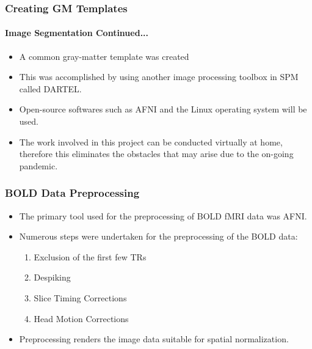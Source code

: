 \documentclass{beamer}
\begin{document}
  \begin{frame}[t]
    \frametitle{Creating GM Templates}
    \framesubtitle{Image Segmentation Continued...}

    \begin{itemize}

      \vskip 25pt

      \item  A common gray-matter template was created  \vskip 10pt

      \item This was accomplished by using another image processing
        toolbox in SPM called DARTEL. \vskip 10pt

      \item Open-source softwares such as AFNI and the Linux operating
        system will be used. \vskip 10pt

      \item The work involved in this project can be conducted
        virtually at home, therefore this eliminates the obstacles
        that may arise due to the on-going pandemic.

    \end{itemize}

  \end{frame}


  \begin{frame}[t]
    \frametitle{BOLD Data Preprocessing}

    \begin{itemize}

      \vskip 25pt

      \item  The primary tool used for the preprocessing of BOLD fMRI
        data was AFNI. \vskip 10pt

      \item Numerous steps were undertaken for the preprocessing of
        the BOLD data:

        \begin{enumerate}
          \item Exclusion of the first few TRs
          \item Despiking
          \item Slice Timing Corrections
          \item Head Motion Corrections
        \end{enumerate} \vskip 10pt

    \item Preprocessing renders the image data suitable for
      spatial normalization.

    \end{itemize}

  \end{frame}
\end{document}
